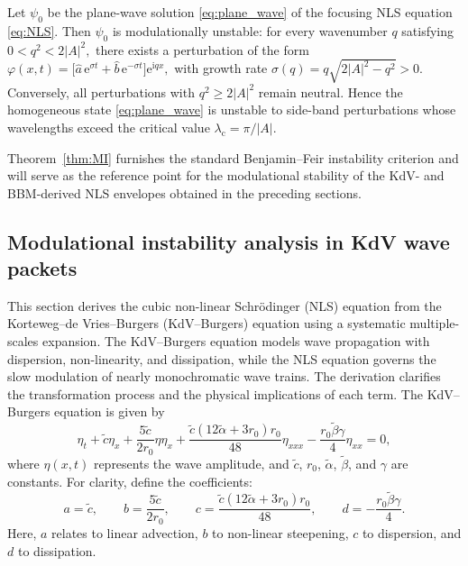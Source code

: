 \documentclass[alpha-refs, 12pt]{wiley-article}
\begin{document}
\begin{theorem}\label{thm:MI}
  Let $\psi_{0}$ be the plane-wave solution \eqref{eq:plane_wave} of the
  focusing NLS equation \eqref{eq:NLS}.  Then $\psi_{0}$ is modulationally
  unstable: for every wavenumber $q$ satisfying
  \(
    0<q^{2}<2|A|^{2},
  \)
  there exists a perturbation of the form
  \(
    \displaystyle
    \varphi(x,t)=\bigl[\hat{a}\,\mathrm{e}^{\sigma t}
                     +\hat{b}\,\mathrm{e}^{-\sigma t}\bigr]
                 \mathrm{e}^{\mathrm{i}qx},
  \)
  with growth rate
  \(
    \displaystyle
    \sigma(q)=q\sqrt{2|A|^{2}-q^{2}}>0.
  \)
  Conversely, all perturbations with $q^{2}\ge2|A|^{2}$ remain
  neutral.  Hence the homogeneous state \eqref{eq:plane_wave} is unstable
  to side-band perturbations whose wavelengths exceed the critical value
  \(
    \lambda_{\mathrm{c}}=\pi/|A|.
  \)
\end{theorem}
Theorem~\ref{thm:MI} furnishes the standard Benjamin--Feir instability criterion and will serve as the reference point for the modulational stability of the KdV- and BBM-derived NLS envelopes obtained in the preceding sections.

\subsection{Modulational instability analysis in KdV wave packets}

This section derives the cubic non-linear Schr\"odinger (NLS) equation from the Korteweg--de Vries--Burgers (KdV--Burgers) equation using a systematic multiple-scales expansion. The KdV--Burgers equation models wave propagation with dispersion, non-linearity, and dissipation, while the NLS equation governs the slow modulation of nearly monochromatic wave trains. The derivation clarifies the transformation process and the physical implications of each term. The KdV--Burgers equation is given by
\begin{equation}
  \eta_{t} + \tilde{c} \eta_{x} + \frac{5 \tilde{c}}{2 r_{0}} \eta \eta_{x} + \frac{\tilde{c} (12 \tilde{\alpha} + 3 r_{0}) r_{0}}{48} \eta_{xxx} - \frac{r_{0} \tilde{\beta} \gamma}{4} \eta_{xx} = 0,
  \label{eq:kdv_burgers}
\end{equation}
where \(\eta(x,t)\) represents the wave amplitude, and \(\tilde{c}\), \(r_{0}\), \(\tilde{\alpha}\), \(\tilde{\beta}\), and \(\gamma\) are constants. For clarity, define the coefficients:
\begin{equation}
  a = \tilde{c}, \qquad b = \frac{5 \tilde{c}}{2 r_{0}}, \qquad c = \frac{\tilde{c} (12 \tilde{\alpha} + 3 r_{0}) r_{0}}{48}, \qquad d = -\frac{r_{0} \tilde{\beta} \gamma}{4}.
  \label{eq:coeffs}
\end{equation}
Here, \(a\) relates to linear advection, \(b\) to non-linear steepening, \(c\) to dispersion, and \(d\) to dissipation.
\end{document}
